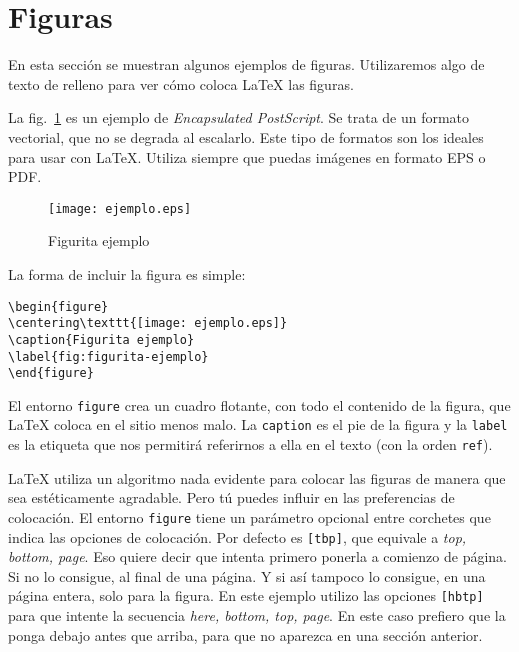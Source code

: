 \section{Figuras}
\label{sec:figuras}

En esta sección se muestran algunos ejemplos de figuras.  Utilizaremos algo de texto de relleno para ver cómo coloca \LaTeX{} las figuras.

La fig.~\ref{fig:figurita-ejemplo} es un ejemplo de \emph{Encapsulated PostScript}.  Se trata de un formato vectorial, que no se degrada al escalarlo.  Este tipo de formatos son los ideales para usar con \LaTeX{}.  Utiliza siempre que puedas imágenes en formato EPS o PDF.

\begin{figure}[hbtp]
\centering
\texttt{[image: ejemplo.eps]}
\caption{Figurita ejemplo}
\label{fig:figurita-ejemplo}
\end{figure}

La forma de incluir la figura es simple:

\begin{lstlisting}[language={[LaTeX]TeX},frame=none,numbers=none]
\begin{figure}
\centering\texttt{[image: ejemplo.eps]}
\caption{Figurita ejemplo}
\label{fig:figurita-ejemplo}
\end{figure}
\end{lstlisting}

El entorno \texttt{figure} crea un cuadro flotante, con todo el contenido de la figura, que \LaTeX{} coloca en el sitio menos malo.  La \texttt{caption} es el pie de la figura y la \texttt{label} es la etiqueta que nos permitirá referirnos a ella en el texto (con la orden \texttt{ref}).

\LaTeX{} utiliza un algoritmo nada evidente para colocar las figuras de manera que sea estéticamente agradable.  Pero tú puedes influir en las preferencias de colocación.  El entorno \texttt{figure} tiene un parámetro opcional entre corchetes que indica las opciones de colocación.  Por defecto es \texttt{[tbp]}, que equivale a \emph{top, bottom, page}.  Eso quiere decir que intenta primero ponerla a comienzo de página.  Si no lo consigue, al final de una página.  Y si así tampoco lo consigue, en una página entera, solo para la figura.  En este ejemplo utilizo las opciones \texttt{[hbtp]} para que intente la secuencia \emph{here, bottom, top, page}.  En este caso prefiero que la ponga debajo antes que arriba, para que no aparezca en una sección anterior.


